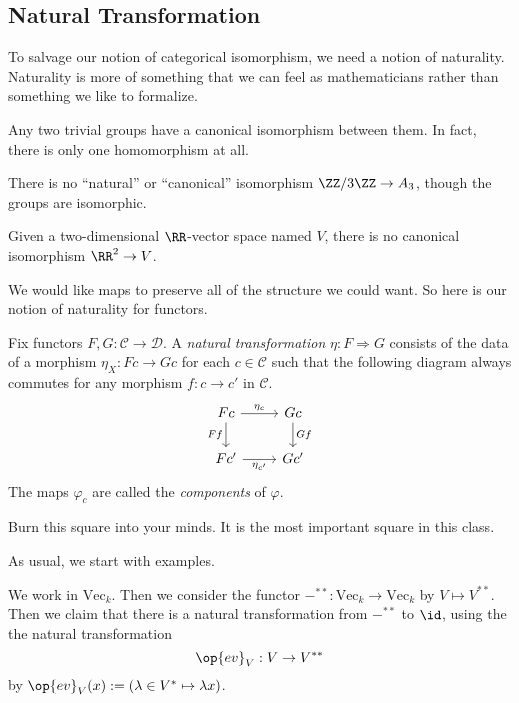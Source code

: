 \subsection{Natural Transformation}
To salvage our notion of categorical isomorphism, we need a notion of naturality. Naturality is more of something that we can feel as mathematicians rather than something we like to formalize.
\begin{example}
	Any two trivial groups have a canonical isomorphism between them. In fact, there is only one homomorphism at all.
\end{example}
\begin{nex}
	There is no ``natural'' or ``canonical'' isomorphism $\ZZ/3\ZZ\to A_3$, though the groups are isomorphic.
\end{nex}
\begin{nex}
	Given a two-dimensional $\RR$-vector space named $V$, there is no canonical isomorphism $\RR^2\to V$.
\end{nex}
We would like maps to preserve all of the structure we could want. So here is our notion of naturality for functors.
\begin{definition}
	Fix functors $F,G:\mathcal C\to\mathcal D$. A \textit{natural transformation} $\eta:F\Rightarrow G$ consists of the data of a morphism $\eta_X:Fc\to Gc$ for each $c\in\mathcal C$ such that the following diagram always commutes for any morphism $f:c\to c'$ in $\mathcal C$.
	\[\begin{tikzcd}
		Fc & Gc \\
		{Fc'} & {Gc'}
		\arrow["Ff"', from=1-1, to=2-1]
		\arrow["Gf", from=1-2, to=2-2]
		\arrow["{\eta_c}", from=1-1, to=1-2]
		\arrow["{\eta_{c'}}"', from=2-1, to=2-2]
	\end{tikzcd}\]
	The maps $\varphi_c$ are called the \textit{components} of $\varphi$.
\end{definition}
\begin{quot}
	Burn this square into your minds. It is the most important square in this class.
\end{quot}
As usual, we start with examples.
\begin{exe}
	We work in $\mathrm{Vec}_k$. Then we consider the functor $-^{**}:\mathrm{Vec}_k\to\mathrm{Vec}_k$ by $V\mapsto V^{**}$. Then we claim that there is a natural transformation from $-^{**}$ to $\id$, using the the natural transformation
	\[\op{ev}_V:V\to V^{**}\]
	by $\op{ev}_V(x):=(\lambda\in V^*\mapsto\lambda x)$.
\end{exe}
